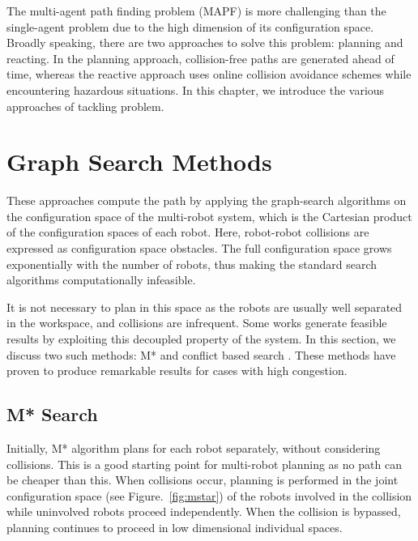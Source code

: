 The multi-agent path finding problem (MAPF) is more challenging than the single-agent problem due to the high dimension of its configuration space. Broadly speaking, there are two approaches to solve this problem: planning and reacting. In the planning approach, collision-free paths are generated ahead of time, whereas the reactive approach uses online collision avoidance schemes while encountering hazardous situations. In this chapter, we introduce the various approaches of tackling problem. 

\section{Graph Search Methods}
These approaches compute the path by applying the graph-search algorithms on the configuration space of the multi-robot system, which is the Cartesian product of the configuration spaces of each robot. Here, robot-robot collisions are expressed as configuration space obstacles. The full configuration space grows exponentially with the number of robots, thus making the standard search algorithms computationally infeasible. 

It is not necessary to plan in this space as the robots are usually well separated in the workspace, and collisions are infrequent. Some works generate feasible results by exploiting this decoupled property of the system. In this section, we discuss two such methods: M* \cite{wagner2011m} and conflict based search \cite{sharon2015conflict}. These methods have proven to produce remarkable results for cases with high congestion. 
\subsection{M* Search}
Initially, M* algorithm plans for each robot separately, without considering collisions. This is a good starting point for multi-robot planning as no path can be cheaper than this. When collisions occur, planning is performed in the joint configuration space (see Figure.~\ref{fig:mstar}) of the robots involved in the collision while uninvolved robots proceed independently. When the collision is bypassed, planning continues to proceed in low dimensional individual spaces. 

